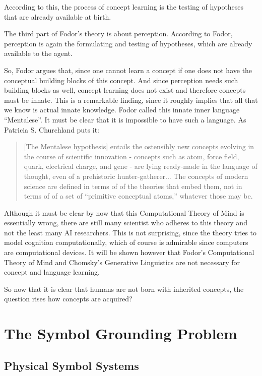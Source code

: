 \n
According to this, the process of concept learning is the testing of hypotheses that are already available at birth.

The third part of Fodor's theory is about perception. According to Fodor, perception is again the formulating and testing of hypotheses, which are already available to the agent.

\p
So, Fodor argues that, since one cannot learn a concept if one does not have the conceptual building blocks of this concept. And since perception needs such building blocks as well, concept learning does not exist and therefore concepts must be innate. This is a remarkable finding, since it roughly implies that all that we know is actual innate knowledge. Fodor called this innate inner language ``Mentalese''. It must be clear that it is impossible to have such a language. As Patricia S. Churchland puts it:

\begin{quote}
[The Mentalese hypothesis] entails the ostensibly new concepts evolving in the course of scientific innovation - concepts such as atom, force field, quark, electrical charge, and gene - are lying ready-made in the language of thought, even of a prehistoric hunter-gatherer... The concepts of modern science are defined in terms of of the theories that embed them, not in terms of of a set of ``primitive conceptual atoms,'' whatever those may be. \cite[p. 389]{p.s.churchland:1986}
\end{quote}

\n
Although it must be clear by now that this Computational Theory of Mind is essentially wrong, there are still many scientist who adheres to this theory and not the least many AI researchers. This is not surprising, since the theory tries to model cognition computationally, which of course is admirable since computers are computational devices. It will be shown however that Fodor's Computational Theory of Mind and Chomsky's Generative Linguistics are not necessary for concept and language learning.

So now that it is clear that humans are not born with inherited concepts, the question rises how concepts are acquired? 

\section{The Symbol Grounding Problem}\label{s:theory:sgp}

\subsection{Physical Symbol Systems}\label{s:theory:pss}

